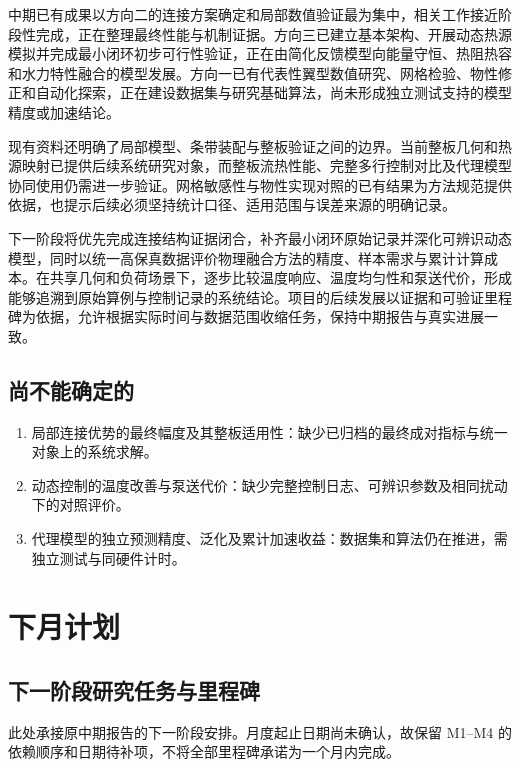 \documentclass[stage2,UTF8,fontset=fandol]{ydzjreport}
\begin{document}
中期已有成果以方向二的连接方案确定和局部数值验证最为集中，相关工作接近阶段性完成，正在整理最终性能与机制证据。方向三已建立基本架构、开展动态热源模拟并完成最小闭环初步可行性验证，正在由简化反馈模型向能量守恒、热阻热容和水力特性融合的模型发展。方向一已有代表性翼型数值研究、网格检验、物性修正和自动化探索，正在建设数据集与研究基础算法，尚未形成独立测试支持的模型精度或加速结论。

现有资料还明确了局部模型、条带装配与整板验证之间的边界。当前整板几何和热源映射已提供后续系统研究对象，而整板流热性能、完整多行控制对比及代理模型协同使用仍需进一步验证。网格敏感性与物性实现对照的已有结果为方法规范提供依据，也提示后续必须坚持统计口径、适用范围与误差来源的明确记录。

下一阶段将优先完成连接结构证据闭合，补齐最小闭环原始记录并深化可辨识动态模型，同时以统一高保真数据评价物理融合方法的精度、样本需求与累计计算成本。在共享几何和负荷场景下，逐步比较温度响应、温度均匀性和泵送代价，形成能够追溯到原始算例与控制记录的系统结论。项目的后续发展以证据和可验证里程碑为依据，允许根据实际时间与数据范围收缩任务，保持中期报告与真实进展一致。
\subsection{尚不能确定的}
\begin{enumerate}
\item 局部连接优势的最终幅度及其整板适用性：缺少已归档的最终成对指标与统一对象上的系统求解。
\item 动态控制的温度改善与泵送代价：缺少完整控制日志、可辨识参数及相同扰动下的对照评价。
\item 代理模型的独立预测精度、泛化及累计加速收益：数据集和算法仍在推进，需独立测试与同硬件计时。
\end{enumerate}
\section{下月计划}
\label{ch:plan}
\subsection{下一阶段研究任务与里程碑}
此处承接原中期报告的下一阶段安排。月度起止日期尚未确认，故保留 M1--M4 的依赖顺序和日期待补项，不将全部里程碑承诺为一个月内完成。
\end{document}
